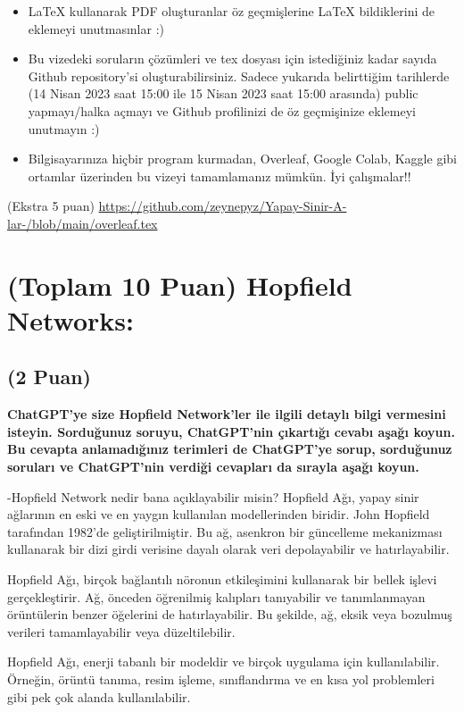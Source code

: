 \documentclass[11pt]{article}
\begin{document}
\begin{itemize}
    \item LaTeX kullanarak PDF oluşturanlar öz geçmişlerine LaTeX bildiklerini de eklemeyi unutmasınlar :)
    \item Bu vizedeki soruların çözümleri ve tex dosyası için istediğiniz kadar sayıda Github repository'si oluşturabilirsiniz. Sadece yukarıda belirttiğim tarihlerde (14 Nisan 2023 saat 15:00 ile 15 Nisan 2023 saat 15:00 arasında) public yapmayı/halka açmayı ve Github profilinizi de öz geçmişinize eklemeyi unutmayın :)
    \item Bilgisayarınıza hiçbir program kurmadan, Overleaf, Google Colab, Kaggle gibi ortamlar üzerinden bu vizeyi tamamlamanız mümkün. İyi çalışmalar!!
\end{itemize}

(Ekstra 5 puan) \url{https://github.com/zeynepyz/Yapay-Sinir-A-lar-/blob/main/overleaf.tex}

\newpage
\section{(Toplam 10 Puan) Hopfield Networks:}

\subsection{(2 Puan)} \textbf{ChatGPT’ye size Hopfield Network’ler ile ilgili detaylı bilgi vermesini isteyin. Sorduğunuz soruyu, ChatGPT'nin çıkartığı cevabı aşağı koyun. Bu cevapta anlamadığınız terimleri de ChatGPT’ye sorup, sorduğunuz soruları ve ChatGPT’nin verdiği cevapları da sırayla aşağı koyun.}

-Hopfield Network nedir bana açıklayabilir misin?
Hopfield Ağı, yapay sinir ağlarının en eski ve en yaygın kullanılan modellerinden biridir. John Hopfield tarafından 1982'de geliştirilmiştir. Bu ağ, asenkron bir güncelleme mekanizması kullanarak bir dizi girdi verisine dayalı olarak veri depolayabilir ve hatırlayabilir.

Hopfield Ağı, birçok bağlantılı nöronun etkileşimini kullanarak bir bellek işlevi gerçekleştirir. Ağ, önceden öğrenilmiş kalıpları tanıyabilir ve tanımlanmayan örüntülerin benzer öğelerini de hatırlayabilir. Bu şekilde, ağ, eksik veya bozulmuş verileri tamamlayabilir veya düzeltilebilir.

Hopfield Ağı, enerji tabanlı bir modeldir ve birçok uygulama için kullanılabilir. Örneğin, örüntü tanıma, resim işleme, sınıflandırma ve en kısa yol problemleri gibi pek çok alanda kullanılabilir.
\end{document}
